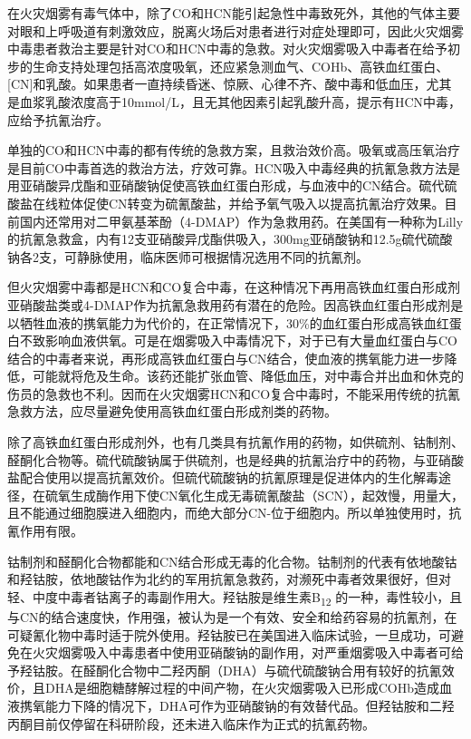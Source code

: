 在火灾烟雾有毒气体中，除了CO和HCN能引起急性中毒致死外，其他的气体主要对眼和上呼吸道有刺激效应，脱离火场后对患者进行对症处理即可，因此火灾烟雾中毒患者救治主要是针对CO和HCN中毒的急救。对火灾烟雾吸入中毒者在给予初步的生命支持处理包括高浓度吸氧，还应紧急测血气、COHb、高铁血红蛋白、{[}CN{]}和乳酸。如果患者一直持续昏迷、惊厥、心律不齐、酸中毒和低血压，尤其是血浆乳酸浓度高于10mmol/L，且无其他因素引起乳酸升高，提示有HCN中毒，应给予抗氰治疗。

单独的CO和HCN中毒的都有传统的急救方案，且救治效价高。吸氧或高压氧治疗是目前CO中毒首选的救治方法，疗效可靠。HCN吸入中毒经典的抗氰急救方法是用亚硝酸异戊酯和亚硝酸钠促使高铁血红蛋白形成，与血液中的CN结合。硫代硫酸盐在线粒体促使CN转变为硫氰酸盐，并给予氧气吸入以提高抗氰治疗效果。目前国内还常用对二甲氨基苯酚（4-DMAP）作为急救用药。在美国有一种称为Lilly的抗氰急救盒，内有12支亚硝酸异戊酯供吸入，300mg亚硝酸钠和12.5g硫代硫酸钠各2支，可静脉使用，临床医师可根据情况选用不同的抗氰剂。

但火灾烟雾中毒都是HCN和CO复合中毒，在这种情况下再用高铁血红蛋白形成剂亚硝酸盐类或4-DMAP作为抗氰急救用药有潜在的危险。因高铁血红蛋白形成剂是以牺牲血液的携氧能力为代价的，在正常情况下，30\%的血红蛋白形成高铁血红蛋白不致影响血液供氧。可是在烟雾吸入中毒情况下，对于已有大量血红蛋白与CO结合的中毒者来说，再形成高铁血红蛋白与CN结合，使血液的携氧能力进一步降低，可能就将危及生命。该药还能扩张血管、降低血压，对中毒合并出血和休克的伤员的急救也不利。因而在火灾烟雾HCN和CO复合中毒时，不能采用传统的抗氰急救方法，应尽量避免使用高铁血红蛋白形成剂类的药物。

除了高铁血红蛋白形成剂外，也有几类具有抗氰作用的药物，如供硫剂、钴制剂、醛酮化合物等。硫代硫酸钠属于供硫剂，也是经典的抗氰治疗中的药物，与亚硝酸盐配合使用以提高抗氰效价。但硫代硫酸钠的抗氰原理是促进体内的生化解毒途径，在硫氧生成酶作用下使CN氧化生成无毒硫氰酸盐（SCN），起效慢，用量大，且不能通过细胞膜进入细胞内，而绝大部分CN-位于细胞内。所以单独使用时，抗氰作用有限。

钴制剂和醛酮化合物都能和CN结合形成无毒的化合物。钴制剂的代表有依地酸钴和羟钴胺，依地酸钴作为北约的军用抗氰急救药，对濒死中毒者效果很好，但对轻、中度中毒者钴离子的毒副作用大。羟钴胺是维生素B\textsubscript{12}
的一种，毒性较小，且与CN的结合速度快，作用强，被认为是一个有效、安全和给药容易的抗氰剂，在可疑氰化物中毒时适于院外使用。羟钴胺已在美国进入临床试验，一旦成功，可避免在火灾烟雾吸入中毒患者中使用亚硝酸钠的副作用，对严重烟雾吸入中毒者可给予羟钴胺。在醛酮化合物中二羟丙酮（DHA）与硫代硫酸钠合用有较好的抗氰效价，且DHA是细胞糖酵解过程的中间产物，在火灾烟雾吸入已形成COHb造成血液携氧能力下降的情况下，DHA可作为亚硝酸钠的有效替代品。但羟钴胺和二羟丙酮目前仅停留在科研阶段，还未进入临床作为正式的抗氰药物。

